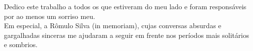 \begin{dedicatoria}
    \vspace*{\fill}
    \begin{flushright}
        Dedico este trabalho a todos os que estiveram do meu lado e foram responsáveis por ao menos um sorriso meu. \\
        Em especial, a Rômulo Silva (in memoriam), cujas conversas absurdas e gargalhadas sinceras me ajudaram a seguir em frente nos períodos mais solitários e sombrios.
    \end{flushright}
\end{dedicatoria}